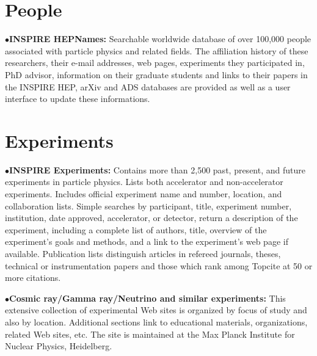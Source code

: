 	\item{}


\medskip




\section{People} %


\item{$\bullet$}{\bf INSPIRE HEPNames:} 
Searchable worldwide database of over 100,000 people associated with particle physics and related fields. The affiliation history of these researchers, their e-mail addresses, web pages, experiments they participated in, PhD advisor, information on their graduate students and links to their papers in the INSPIRE HEP, arXiv and ADS databases are provided as well as a user interface to update these informations.

	\item{}

\medskip


\section{Experiments}  %

\item{$\bullet$}{\bf INSPIRE Experiments:} 
Contains more than 2,500 past, present, and future experiments in particle physics. Lists both accelerator and non-accelerator experiments. Includes official experiment name and number, location, and collaboration lists. Simple searches by participant, title, experiment number, institution, date approved, accelerator, or detector, return a description of the experiment, including a complete list of authors, title, overview of the experiment's goals and methods, and a link to the experiment's web page if available. Publication lists distinguish articles in refereed journals, theses, technical or instrumentation papers and those which rank among Topcite at 50 or more citations.
 
	\item{}

\medskip

\item{$\bullet$}{\bf Cosmic ray/Gamma ray/Neutrino and similar experiments:} 
This extensive collection of experimental Web sites is organized by focus of study and also by location. Additional sections link to educational materials, organizations, related Web sites, etc. The site is maintained at the Max Planck Institute for Nuclear Physics, Heidelberg.
	\item{}

